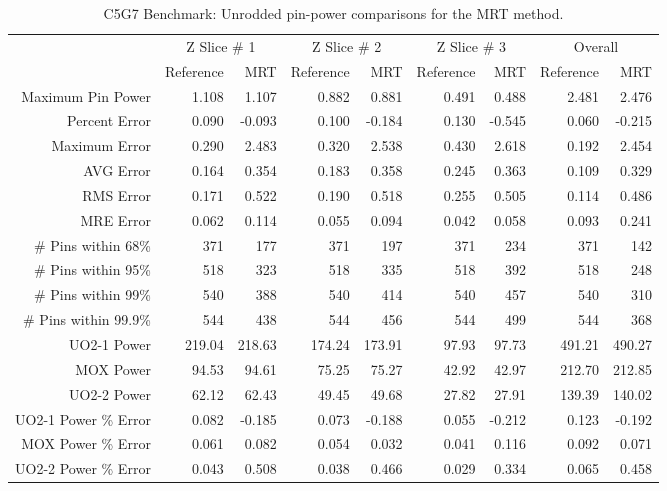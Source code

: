 {{{{        \begin{table}[htbp]
          \centering
          \caption{C5G7 Benchmark: Unrodded pin-power comparisons for the MRT method. \label{tab:MR:C5G7:Unrodded-MRT}}
          \scriptsize
          \begin{tabular}{rrrrrrrrr}\toprule
                                  & \multicolumn{2}{c}{Z Slice \# 1} & \multicolumn{2}{c}{Z Slice \# 2} & \multicolumn{2}{c}{Z Slice \# 3} & \multicolumn{2}{c}{Overall}\\
                                  & Reference & MRT & Reference & MRT & Reference & MRT & Reference & MRT\\\midrule
            Maximum Pin Power     & 1.108 & 1.107 & 0.882 & 0.881 & 0.491 & 0.488 & 2.481 & 2.476\\
            Percent Error         & 0.090 & -0.093 & 0.100 & -0.184 & 0.130 & -0.545 & 0.060 & -0.215\\\midrule
            Maximum Error         & 0.290 & 2.483 & 0.320 & 2.538 & 0.430 & 2.618 & 0.192 & 2.454\\
            AVG Error             & 0.164 & 0.354 & 0.183 & 0.358 & 0.245 & 0.363 & 0.109 & 0.329\\
            RMS Error             & 0.171 & 0.522 & 0.190 & 0.518 & 0.255 & 0.505 & 0.114 & 0.486\\
            MRE Error             & 0.062 & 0.114 & 0.055 & 0.094 & 0.042 & 0.058 & 0.093 & 0.241\\\midrule
            \# Pins within 68\%   & 371 & 177 & 371 & 197 & 371 & 234 & 371 & 142\\
            \# Pins within 95\%   & 518 & 323 & 518 & 335 & 518 & 392 & 518 & 248\\
            \# Pins within 99\%   & 540 & 388 & 540 & 414 & 540 & 457 & 540 & 310\\
            \# Pins within 99.9\% & 544 & 438 & 544 & 456 & 544 & 499 & 544 & 368\\\midrule
            UO2-1 Power           & 219.04 & 218.63 & 174.24 & 173.91 & 97.93 & 97.73 & 491.21 & 490.27\\
            MOX Power             & 94.53 & 94.61 & 75.25 & 75.27 & 42.92 & 42.97 & 212.70 & 212.85\\
            UO2-2 Power           & 62.12 & 62.43 & 49.45 & 49.68 & 27.82 & 27.91 & 139.39 & 140.02\\
            UO2-1 Power \% Error  & 0.082 & -0.185 & 0.073 & -0.188 & 0.055 & -0.212 & 0.123 & -0.192\\
            MOX Power \% Error    & 0.061 & 0.082 & 0.054 & 0.032 & 0.041 & 0.116 & 0.092 & 0.071\\
            UO2-2 Power \% Error  & 0.043 & 0.508 & 0.038 & 0.466 & 0.029 & 0.334 & 0.065 & 0.458\\\bottomrule
          \end{tabular}
        \end{table}

}}}}
